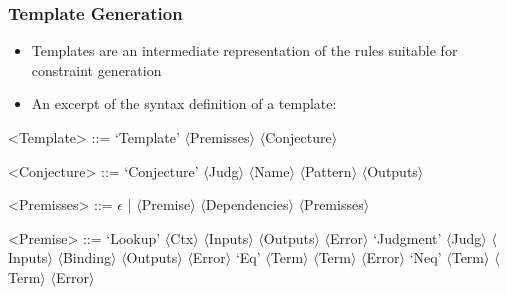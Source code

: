 \documentclass{beamer}
\begin{document}
\renewcommand*\selectTemplateGeneration{orange}
\renewcommand*\selectTemplateGeneration{}





\begin{frame}
  \frametitle{Template Generation}
  \begin{itemize}
  \item Templates are an intermediate representation of the rules
    suitable for constraint generation
  \item An excerpt of the syntax definition of a template:
  \end{itemize}

  \begin{grammar}
    <Template> ::= `Template' $\langle$Premisses$\rangle$ $\langle$Conjecture$\rangle$

    <Conjecture> ::= `Conjecture' $\langle$Judg$\rangle$ $\langle$Name$\rangle$ $\langle$Pattern$\rangle$ $\langle$Outputs$\rangle$

    <Premisses> ::= $\epsilon$ | $\langle$Premise$\rangle$ $\langle$Dependencies$\rangle$ $\langle$Premisses$\rangle$

    <Premise> ::= `Lookup' $\langle$Ctx$\rangle$ $\langle$Inputs$\rangle$ $\langle$Outputs$\rangle$ $\langle$Error$\rangle$
    \alt `Judgment' $\langle$Judg$\rangle$ $\langle$Inputs$\rangle$ $\langle$Binding$\rangle$ $\langle$Outputs$\rangle$ $\langle$Error$\rangle$
    \alt `Eq' $\langle$Term$\rangle$ $\langle$Term$\rangle$ $\langle$Error$\rangle$
    \alt `Neq' $\langle$Term$\rangle$ $\langle$Term$\rangle$ $\langle$Error$\rangle$
  \end{grammar}
\end{frame}
\end{document}
